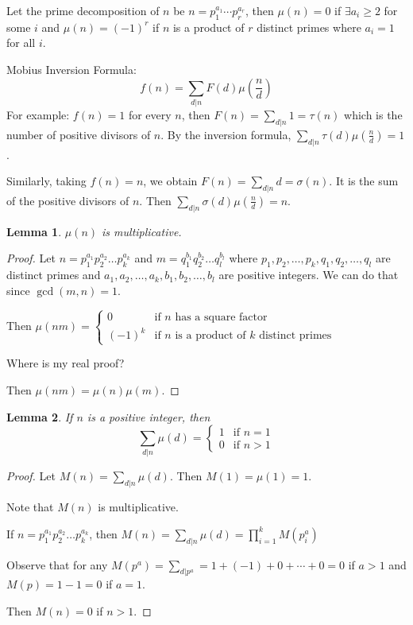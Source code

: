 \documentclass[letterpaper,12pt,oneside]{article}
\newtheorem*{lemma}{Lemma}
\begin{document}
Let the prime decomposition of $n$ be $n=p_1^{a_1}\cdots p_r^{a_r}$, then $\mu(n)=0$ if $\exists a_i\ge 2$ for some $i$ and $\mu(n)=(-1)^r$ if $n$ is a product of $r$ distinct primes where $a_i=1$ for all $i$.

Mobius Inversion Formula: \[
    f(n)=\sum_{d|n}F(d)\mu(\frac{n}{d})
\]
For example: $f(n)=1$ for every $n$, then $F(n)=\sum_{d|n}1=\tau(n)$ which is the number of positive divisors of $n$. By the inversion formula, $\sum_{d|n}\tau(d)\mu(\frac{n}{d})=1$.

Similarly, taking $f(n)=n$, we obtain $F(n)=\sum_{d|n}d=\sigma(n)$. It is the sum of the positive divisors of $n$. Then $\sum_{d|n}\sigma(d)\mu(\frac{n}{d})=n$.
\begin{lemma}
    $\mu(n)$ is multiplicative.
\end{lemma}
\begin{proof}
    Let $n=p_1^{a_1}p_2^{a_2}\ldots p_k^{a_k}$ and $m=q_1^{b_1}q_2^{b_2}\ldots q_l^{b_l}$ where $p_1,p_2,\ldots,p_k,q_1,q_2,\ldots,q_l$ are distinct primes and $a_1,a_2,\ldots,a_k,b_1,b_2,\ldots,b_l$ are positive integers. We can do that since $\gcd(m,n)=1$.

    Then $\mu(nm)=\begin{cases}
        0 & \text{if } n \text{ has a square factor} \\
        (-1)^k & \text{if } n \text{ is a product of } k \text{ distinct primes}
    \end{cases}$

    Where is my real proof?

    Then $\mu(nm)=\mu(n)\mu(m)$.
\end{proof}
\begin{lemma}
    If $n$ is a positive integer, then \[
        \sum_{d|n}\mu(d)=\begin{cases}
            1 & \text{if } n=1 \\
            0 & \text{if } n>1
        \end{cases}
    \]
\end{lemma}
\begin{proof}
    Let $M(n)=\sum_{d|n}\mu(d)$. Then $M(1)=\mu(1)=1$. 

    Note that $M(n)$ is multiplicative.

    If $n=p_1^{a_1}p_2^{a_2}\ldots p_k^{a_k}$, then $M(n)=\sum_{d|n}\mu(d)=\prod_{i=1}^k M(p_i^a)$%

    Observe that for any $M(p^a)=\sum_{d|p^a}=1+(-1)+0+\cdots+0=0$ if $a>1$ and $M(p)=1-1=0$ if $a=1$.

    Then $M(n)=0$ if $n>1$.
\end{proof}
\end{document}
